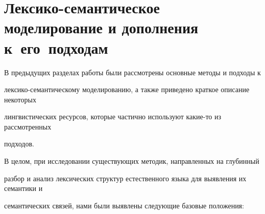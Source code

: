       


   \section{Лексико-семантическое моделирование и дополнения к~его~подходам}


   


   В предыдущих разделах работы были рассмотрены основные методы и подходы к 


лексико-семантическому моделированию, а также приведено краткое описание некоторых 


лингвистических ресурсов, которые частично используют ка\-кие-то из рассмотренных 


подходов.


   


   В целом, при исследовании существующих методик, направленных на глубинный 


разбор и анализ лексических структур естественного языка для выявления их семантики и 


семантических связей, нами были выявлены следующие базовые положения:


